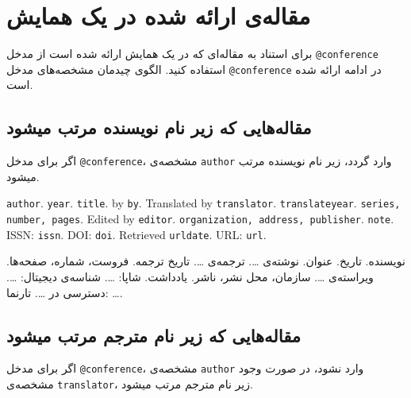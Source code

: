 \documentclass[a4paper,11pt]{article}
\begin{document}
\section{مقاله‌ی ارائه شده در یک همایش}
برای استناد به مقاله‌ای که در یک همایش ارائه شده است از مدخل \verb|@conference| استفاده کنید. الگوی چیدمان مشخصه‌های مدخل \verb|@conference| در ادامه ارائه شده است.





\subsection{مقاله‌هایی که زیر نام نویسنده مرتب میشود}
اگر برای مدخل \verb|@conference|، مشخصه‌ی \verb|author| وارد گردد، زیر نام نویسنده مرتب میشود.

\begin{itemize}[nosep]
\begin{latin}
\item[] []
{\tt author}. {\tt year}. {\tt title}. by {\tt by}. Translated by {\tt translator}. {\tt translateyear}. {\tt series, number, pages}. Edited by {\tt editor}. {\tt organization, address, publisher}. {\tt note}. ISSN: {\tt issn}. DOI: {\tt doi}. Retrieved {\tt urldate}. URL: {\tt url}. 
\end{latin}

\item[] []
{\persianttfamily نویسنده}. {\persianttfamily تاریخ}. {\persianttfamily عنوان}. نوشته‌ی {\persianttfamily …}. ترجمه‌ی {\persianttfamily …}. {\persianttfamily تاریخ ترجمه}. {\persianttfamily فروست، شماره، صفحه‌ها}. ویراسته‌ی {\persianttfamily …}. {\persianttfamily سازمان، محل نشر، ناشر}. {\persianttfamily یادداشت}. شاپا: {\persianttfamily …}. شناسه‌ی دیجیتال: {\persianttfamily …}. دسترسی در {\persianttfamily …}. تارنما: {\persianttfamily …}. 
\end{itemize}





\subsection{مقاله‌هایی که زیر نام مترجم مرتب میشود}
اگر برای مدخل \verb|@conference|، مشخصه‌ی \verb|author| وارد نشود، در صورت وجود مشخصه‌ی \verb|translator|، زیر نام مترجم مرتب میشود.
\end{document}
